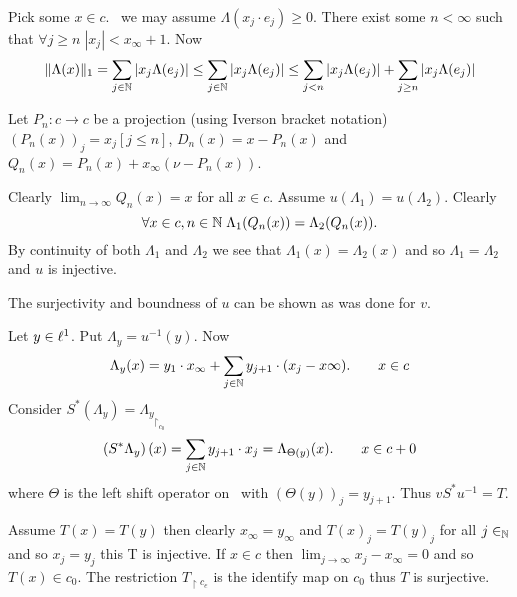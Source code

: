 \begin{enumerate}
\begin{itemize}
\iffalse
To show \(u(\Lambda)\in\ellone\)
Let \(\mu\in c\) defined by \(\mu_j = \overline{\Lambda(e_j)}\).
Let \(a_\Lambda \in \ellinf\) defined by
\((a_\Lambda)_j = \exp(-i\arg(\Lambda(e_j)\) if defined or $1$ otherwise.
Thus  \(|(a_\Lambda)_j|=1\) and
\(\Lambda((a_\Lambda)_j\cdot e_j) = \Lambda(e_j)|\).
Let \(\mu_\Lambda(x) : c \to c\) defined by
\(\mu_\Lambda(x)_j = (a_\Lambda)_j \cdot x_j\).
\fi

Pick some \(x\in c\).
\Wlogy\ we may assume \(\Lambda(x_j\cdot e_j) \geq 0\).
There exist some \(n < \infty\) such that
\(\forall j\geq n\; |x_j| < x_\infty + 1\). Now
\begin{align*}
\|\Lambda(x)\|_1
= \sum_{j\in\mathbb{N}} |x_j\Lambda(e_j)|
\leq \sum_{j\in\mathbb{N}} |x_j\Lambda(e_j)|
\leq \sum_{j< n} |x_j\Lambda(e_j)|
     + \sum_{j\geq n} |x_j\Lambda(e_j)|
\end{align*}

Let \(P_n: c\to c\) be a projection (using Iverson bracket notation)
\((P_n(x))_j = x_j[j \leq n]\),
\(D_n(x) = x - P_n(x)\)
and \(Q_n(x) = P_n(x) + x_\infty (\nu - P_n(x))\).



Clearly \(\lim_{n\to\infty}Q_n(x) = x\) for all \(x\in c\).
Assume \(u(\Lambda_1) = u(\Lambda_2)\).
Clearly
\begin{equation*}
\forall x\in c,n\in\mathbb{N}\;\Lambda_1(Q_n(x)) = \Lambda_2(Q_n(x)).
\end{equation*}
By continuity of both \(\Lambda_1\) and \(\Lambda_2\)
we see that 
\(\Lambda_1(x) = \Lambda_2(x)\) and so
\(\Lambda_1 = \Lambda_2\) and $u$ is injective.

The surjectivity and boundness of $u$ can be shown as was done for $v$.

Let \(y\in \ell^1\). Put \(\Lambda_y = u^{-1}(y)\).
Now
\begin{equation*}
\Lambda_y(x) = y_1\cdot x_\infty + \sum_{j\in\mathbb{N}} y_{j+1}\cdot(x_j - x\infty).
\qquad x\in c
\end{equation*}
Consider \(S^*(\Lambda_y) = {\Lambda_y}_{\restriction_{c_0}}\)
\begin{equation*}
\left(S^*\Lambda_y\right)(x) = \sum_{j\in\mathbb{N}} y_{j+1}\cdot x_j
= \Lambda_{\Theta(y)}(x).
\qquad x\in c+0
\end{equation*}
where \(\Theta\) is the left shift operator on \ellone\ with
\((\Theta(y))_j = y_{j+1}\).
Thus \(vS^*u^{-1} = T\).

Assume \(T(x) = T(y)\)
then clearly \(x_\infty = y_\infty\)
and \(T(x)_j = T(y)_j\) for all \(j\in_{\mathbb{N}}\) and so \(x_j = y_j\)
this T is injective.
If \(x\in c\) then \(\lim_{j\to\infty} x_j-x_\infty = 0\) and so \(T(x)\in c_0\).
The restriction \(T_{\restriction c_e}\) is the identify map on \(c_0\)
thus $T$ is surjective.


\end{itemize}
\end{enumerate}
